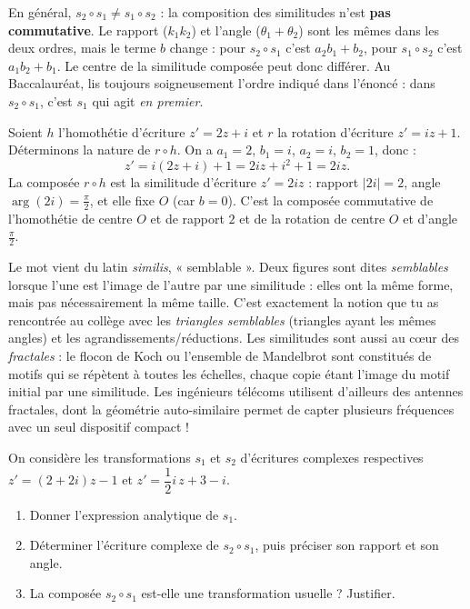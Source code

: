 \documentclass[11pt]{article}
\begin{document}
\begin{attention}
En général, $s_2 \circ s_1 \neq s_1 \circ s_2$ : la composition des similitudes n'est \textbf{pas commutative}. Le rapport ($k_1 k_2$) et l'angle ($\theta_1 + \theta_2$) sont les mêmes dans les deux ordres, mais le terme $b$ change : pour $s_2 \circ s_1$ c'est $a_2 b_1 + b_2$, pour $s_1 \circ s_2$ c'est $a_1 b_2 + b_1$. Le centre de la similitude composée peut donc différer. Au Baccalauréat, lis toujours soigneusement l'ordre indiqué dans l'énoncé : dans $s_2 \circ s_1$, c'est $s_1$ qui agit \emph{en premier}.
\end{attention}

\begin{exemplebox}
Soient $h$ l'homothétie d'écriture $z' = 2z + i$ et $r$ la rotation d'écriture $z' = iz + 1$. Déterminons la nature de $r \circ h$. On a $a_1 = 2$, $b_1 = i$, $a_2 = i$, $b_2 = 1$, donc :
\[ z' = i(2z + i) + 1 = 2iz + i^2 + 1 = 2iz. \]
La composée $r \circ h$ est la similitude d'écriture $z' = 2iz$ : rapport $|2i| = 2$, angle $\arg(2i) = \frac{\pi}{2}$, et elle fixe $O$ (car $b = 0$). C'est la composée commutative de l'homothétie de centre $O$ et de rapport $2$ et de la rotation de centre $O$ et d'angle $\frac{\pi}{2}$.
\end{exemplebox}

\begin{savaistu}
Le mot vient du latin \emph{similis}, « semblable ». Deux figures sont dites \emph{semblables} lorsque l'une est l'image de l'autre par une similitude : elles ont la même forme, mais pas nécessairement la même taille. C'est exactement la notion que tu as rencontrée au collège avec les \emph{triangles semblables} (triangles ayant les mêmes angles) et les agrandissements/réductions. Les similitudes sont aussi au cœur des \emph{fractales} : le flocon de Koch ou l'ensemble de Mandelbrot sont constitués de motifs qui se répètent à toutes les échelles, chaque copie étant l'image du motif initial par une similitude. Les ingénieurs télécoms utilisent d'ailleurs des antennes fractales, dont la géométrie auto-similaire permet de capter plusieurs fréquences avec un seul dispositif compact !
\end{savaistu}

\begin{exercice}
On considère les transformations $s_1$ et $s_2$ d'écritures complexes respectives $z' = (2 + 2i)z - 1$ et $z' = \dfrac{1}{2}i\, z + 3 - i$.
\begin{enumerate}
\item Donner l'expression analytique de $s_1$.
\item Déterminer l'écriture complexe de $s_2 \circ s_1$, puis préciser son rapport et son angle.
\item La composée $s_2 \circ s_1$ est-elle une transformation usuelle ? Justifier.
\end{enumerate}
\end{exercice}
\end{document}

